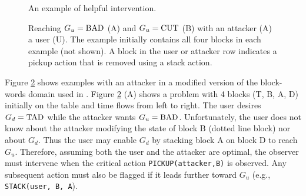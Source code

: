 \documentclass[letterpaper]{article}
\theoremstyle{plain}
\begin{document}
\begin{figure}[b]
\vspace{-5mm}        
         \vspace{0.1mm}
        \caption{An example of helpful intervention. }
        \label{fig:single}
\vspace{-5mm}        
\end{figure}


\begin{figure}
\vspace{-5mm}        
        \caption{Reaching $G_u=\textnormal{BAD}$ (A) and $G_u=\textnormal{CUT}$ (B) with an attacker (A) a user (U).  The example initially contains all four blocks in each example (not shown). A block in the user or attacker row indicates a pickup action that is removed using a stack action.}
        \label{fig:multi}
\vspace{-5mm}
\end{figure}

Figure \ref{fig:multi} shows examples with an attacker in a modified version of the block-words domain used in \cite{ramirez2009plan}.
Figure \ref{fig:multi} (A) shows a problem with 4 blocks (T, B, A, D) initially on the table and time flows from left to right. 
The user desires $G_d=\textnormal{TAD}$ while the attacker wants $G_u=\textnormal{BAD}$.
Unfortunately, the user does not know about the attacker modifying the state of block B (dotted line block) nor about $G_d$.
Thus the user may enable $G_d$ by stacking block A on block D to reach $G_u$. 
Therefore, assuming both the user and the attacker are optimal, the observer must intervene when the critical action \texttt{PICKUP(attacker,B)} is observed. 
Any subsequent action must also be flagged if it leads further toward $G_u$ (e.g., \texttt{STACK(user, B, A}). 
\end{document}
